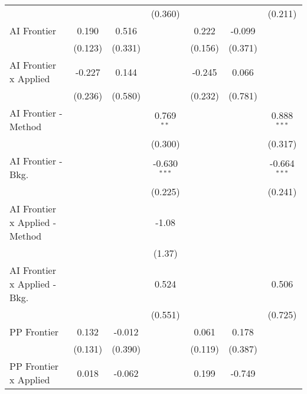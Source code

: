 \begin{tabular}{lcccccc}
                                  &               &               & (0.360)        &               &               & (0.211)\\   
   AI Frontier                    & 0.190         & 0.516         &                & 0.222         & -0.099        &   \\   
                                  & (0.123)       & (0.331)       &                & (0.156)       & (0.371)       &   \\   
   AI Frontier x Applied          & -0.227        & 0.144         &                & -0.245        & 0.066         &   \\   
                                  & (0.236)       & (0.580)       &                & (0.232)       & (0.781)       &   \\   
   AI Frontier - Method           &               &               & 0.769$^{**}$   &               &               & 0.888$^{***}$\\   
                                  &               &               & (0.300)        &               &               & (0.317)\\   
   AI Frontier - Bkg.             &               &               & -0.630$^{***}$ &               &               & -0.664$^{***}$\\   
                                  &               &               & (0.225)        &               &               & (0.241)\\   
   AI Frontier x Applied - Method &               &               & -1.08          &               &               &   \\   
                                  &               &               & (1.37)         &               &               &   \\   
   AI Frontier x Applied - Bkg.   &               &               & 0.524          &               &               & 0.506\\   
                                  &               &               & (0.551)        &               &               & (0.725)\\   
   PP Frontier                    & 0.132         & -0.012        &                & 0.061         & 0.178         &   \\   
                                  & (0.131)       & (0.390)       &                & (0.119)       & (0.387)       &   \\   
   PP Frontier x Applied          & 0.018         & -0.062        &                & 0.199         & -0.749        &   \\   

\end{tabular}
